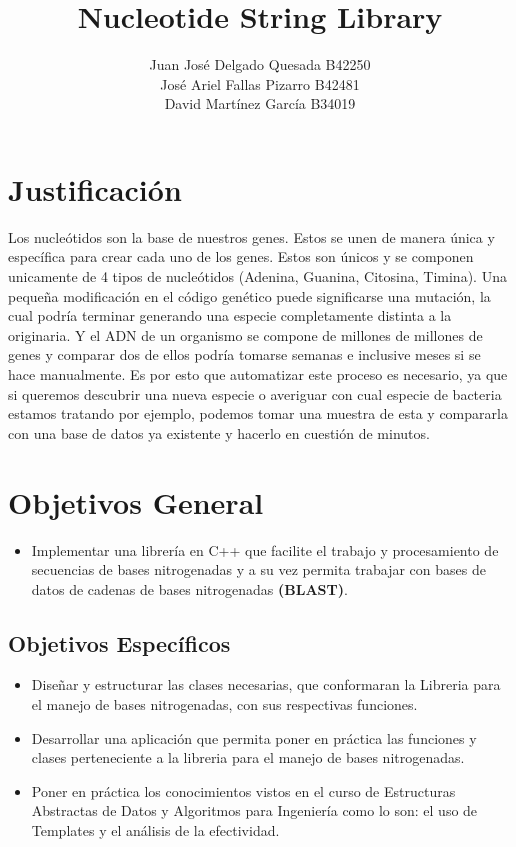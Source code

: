 \documentclass[10pt,a4paper,spanish] {article}
\begin{document}
\title{Nucleotide String Library}
\author{Juan José Delgado Quesada B42250\\José Ariel  Fallas Pizarro B42481\\David Martínez García B34019}

\maketitle

\section{Justificación}

Los nucleótidos son la base de nuestros genes. Estos se unen de manera única y específica para crear cada uno de los genes. Estos son únicos y se componen unicamente de 4 tipos de nucleótidos (Adenina, Guanina, Citosina, Timina). 
Una pequeña modificación en el código genético puede significarse una mutación, la cual podría terminar generando una especie completamente distinta a la originaria. 
Y el ADN de un organismo se compone de millones de millones de genes y comparar dos de ellos podría tomarse semanas e inclusive meses si se hace manualmente. Es por esto que automatizar este proceso es necesario, ya que si queremos descubrir una nueva especie o averiguar con cual especie de bacteria estamos tratando por ejemplo, podemos tomar una muestra de esta y compararla con una base de datos ya existente y hacerlo en cuestión de minutos.

\section{Objetivos General}

\begin{itemize}
\item Implementar una librer\'ia en C++ que facilite el trabajo y procesamiento de secuencias de bases nitrogenadas y a su vez permita trabajar con bases de datos de cadenas de bases nitrogenadas \textbf{(BLAST)}.
\end{itemize}

\subsection{Objetivos Específicos}
\begin{itemize}
\item Diseñar y estructurar las clases necesarias, que conformaran la Libreria para el manejo de bases nitrogenadas, con sus respectivas funciones.
\item Desarrollar una aplicación que permita poner en práctica las funciones y clases perteneciente a la libreria para el manejo de bases nitrogenadas.
\item Poner en práctica los conocimientos vistos en el curso de Estructuras Abstractas de Datos y Algoritmos para Ingeniería como lo son: el uso de Templates y el análisis de la efectividad.
\end{itemize}
\end{document}
